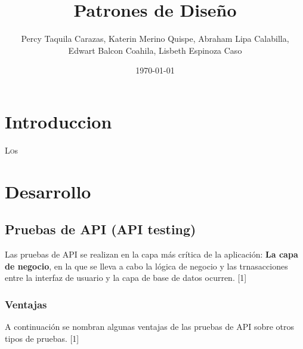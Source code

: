 \documentclass[twoside,twocolumn]{article}
\title{Patrones de Diseño}
\author{Percy Taquila Carazas, Katerin Merino Quispe, Abraham Lipa Calabilla,
\\Edwart Balcon Coahila, Lisbeth Espinoza Caso}
\date{\today}
\begin{document}
\maketitle


\section{Introduccion}

\lettrine[nindent=0em,lines=3]{L}os





\section{Desarrollo}

\subsection{Pruebas de API (API testing)}

Las pruebas de API se realizan en la capa más crítica de la aplicación: \textbf{La capa de negocio}, en la que se lleva a cabo la lógica de negocio y las trnasacciones entre la interfaz de usuario y la capa de base de datos ocurren. [1]

\subsubsection{Ventajas}

A continuación se nombran algunas ventajas de las pruebas de API sobre otros tipos de pruebas. [1]
\end{document}
